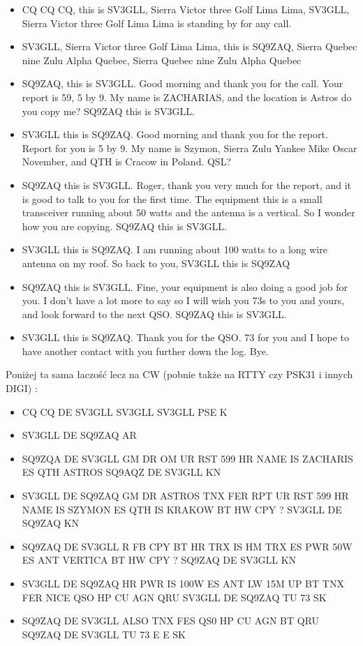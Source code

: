 \documentclass[a4paper,12pt]{article}
\begin{document}
\begin{itemize}
 \item CQ CQ CQ, this is SV3GLL, Sierra Victor three Golf Lima Lima, SV3GLL, Sierra Victor three Golf Lima Lima is standing by for any call.
 \item SV3GLL, Sierra Victor three Golf Lima Lima, this is SQ9ZAQ, Sierra Quebec nine Zulu Alpha Quebec, Sierra Quebec nine Zulu Alpha Quebec
 \item SQ9ZAQ, this is SV3GLL. Good morning and thank you for the call. Your report is 59, 5 by 9. My name is ZACHARIAS, and the location is Astros do you copy me? SQ9ZAQ this is SV3GLL.
 \item SV3GLL this is SQ9ZAQ. Good morning and thank you for the report. Report for you is 5 by 9. My name is Szymon, Sierra Zulu Yankee Mike Oscar November, and QTH is Cracow in Poland. QSL?
 \item SQ9ZAQ this is SV3GLL. Roger, thank you very much for the report, and it is good to talk to you for the first time. The equipment this is a small transceiver running about 50 watts and the antenna is a vertical. So I wonder how you are copying. SQ9ZAQ this is SV3GLL.
 \item SV3GLL this is SQ9ZAQ. I am running about 100 watts to a long wire antenna on my roof. So back to you, SV3GLL this is SQ9ZAQ
 \item SQ9ZAQ this is SV3GLL. Fine, your equipment is also doing a good job for you. I don't have a lot more to say so I will wish you 73s to you and yours, and look forward to the next QSO. SQ9ZAQ this is SV3GLL.
 \item SV3GLL this is SQ9ZAQ. Thank you for the QSO. 73 for you and I hope to have another contact with you further down the log. Bye.
\end
{itemize}
Poniżej ta sama łaczość lecz na CW (pobnie także na RTTY czy PSK31 i innych DIGI) :
\begin{itemize}
\item CQ CQ DE SV3GLL SV3GLL SV3GLL PSE K
\item SV3GLL DE SQ9ZAQ AR
\item SQ9ZQA DE SV3GLL GM DR OM UR RST 599 HR NAME IS ZACHARIS ES QTH ASTROS SQ9AQZ DE SV3GLL KN
\item SV3GLL DE SQ9ZAQ GM DR ASTROS TNX FER RPT UR RST 599 HR NAME IS SZYMON ES QTH IS KRAKOW BT HW CPY ? SV3GLL DE SQ9ZAQ KN
 \item SQ9ZAQ DE SV3GLL R FB CPY BT HR TRX IS HM TRX ES PWR 50W ES ANT VERTICA BT HW CPY ? SQ9ZAQ DE SV3GLL KN 
 \item SV3GLL DE SQ9ZAQ HR PWR IS 100W ES ANT LW 15M UP BT TNX FER NICE QSO HP CU AGN QRU SV3GLL DE SQ9ZAQ TU 73 SK
 \item SQ9ZAQ DE SV3GLL ALSO TNX FES QS0 HP CU AGN BT QRU SQ9ZAQ DE SV3GLL TU 73 E E SK
\end{itemize}
\end{document}
